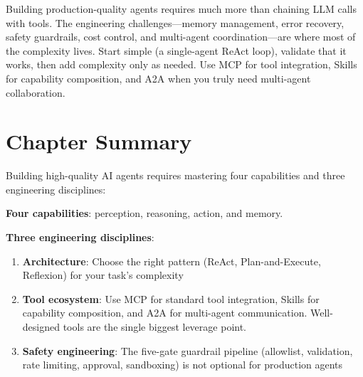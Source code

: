 \begin{keytakeaway}
Building production-quality agents requires much more than chaining LLM calls with tools. The engineering challenges---memory management, error recovery, safety guardrails, cost control, and multi-agent coordination---are where most of the complexity lives. Start simple (a single-agent ReAct loop), validate that it works, then add complexity only as needed. Use MCP for tool integration, Skills for capability composition, and A2A when you truly need multi-agent collaboration.
\end{keytakeaway}

\section{Chapter Summary}

Building high-quality AI agents requires mastering four capabilities and three engineering disciplines:

\textbf{Four capabilities}: perception, reasoning, action, and memory.

\textbf{Three engineering disciplines}:
\begin{enumerate}[leftmargin=*]
    \item \textbf{Architecture}: Choose the right pattern (ReAct, Plan-and-Execute, Reflexion) for your task's complexity
    \item \textbf{Tool ecosystem}: Use MCP for standard tool integration, Skills for capability composition, and A2A for multi-agent communication. Well-designed tools are the single biggest leverage point.
    \item \textbf{Safety engineering}: The five-gate guardrail pipeline (allowlist, validation, rate limiting, approval, sandboxing) is not optional for production agents
\end{enumerate}
